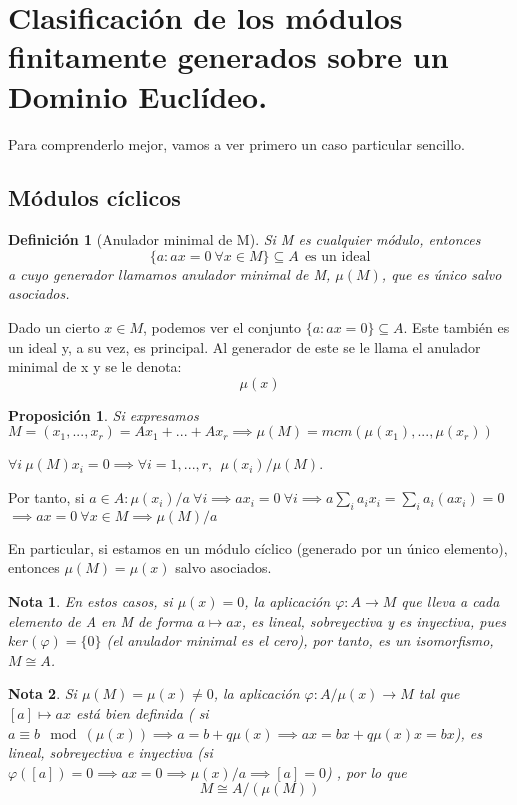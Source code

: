 \documentclass[11pt, a4paper, titlepage]{article}
\makeatletter
\renewenvironment{proof}[1][\proofname] {\vspace{-15pt}\par\pushQED{\qed}\normalfont\topsep6\p@\@plus6\p@\relax\trivlist\item[\hskip\labelsep\it#1\@addpunct{.}]\ignorespaces}{\popQED\endtrivlist\@endpefalse}
\theoremstyle{theorem-style}
\newtheorem*{nprop}{Proposición}
\theoremstyle{definition-style}
\newtheorem*{ndef}{Definición}
\theoremstyle{remark-style}
\newtheorem*{nota}{Nota}
\theoremstyle{example-style}
\makeatother
\begin{document}
\section{Clasificación de los módulos finitamente generados sobre un Dominio Euclídeo.}

Para comprenderlo mejor, vamos a ver primero un caso particular sencillo.
\subsection{Módulos cíclicos}
\begin{ndef}[Anulador minimal de M]
	Si M es cualquier módulo, entonces
	\[
	\{a: ax = 0 \ \forall x \in M\}\subseteq A \ \  \text{es un ideal}
	\]
	a cuyo generador llamamos anulador minimal de M, $\mu(M)$, que es único salvo asociados.
\end{ndef}

Dado un cierto $x\in M$, podemos ver el conjunto $\{a : ax = 0\} \subseteq A$. Este también es un ideal y, a su vez, es principal. Al generador de este se le llama el anulador minimal de x y se le denota:
\[
\mu(x)
\]

\begin{nprop}
	Si expresamos $M= (x_1,...,x_r) = Ax_1 + ...+ Ax_r \implies \mu(M) = mcm(\mu(x_1),...,\mu(x_r))$
\end{nprop}
\begin{proof}
	$\forall i \ \mu(M)x_i = 0 \implies \forall i=1,...,r, \ \ \mu(x_i) / \mu(M)$.
	
	Por tanto, si $a\in A: \mu(x_i)/a \ \forall i \implies ax_i = 0 \ \forall i \implies a\sum_i a_ix_i = \sum_i a_i(ax_i) = 0$
	$\implies ax = 0 \ \forall x \in M \implies \mu(M) / a$
\end{proof}

En particular, si estamos en un módulo cíclico (generado por un único elemento), entonces $\mu(M) = \mu(x)$ salvo asociados.

\begin{nota}
	En estos casos, si $\mu(x) = 0$, la aplicación $\varphi: A \to M$ que lleva a cada elemento de A en M de forma $a \mapsto ax$, es lineal, sobreyectiva y es inyectiva, pues $ker(\varphi) = \{0\}$ (el anulador minimal es el cero), por tanto, es un isomorfismo, $M \cong A$.
\end{nota}

\begin{nota}
	Si $\mu(M) = \mu(x) \ne 0$, la aplicación $\varphi :A/\mu(x) \to M$ tal que $[a]\mapsto ax$ está bien definida ( si $a \equiv b \mod(\mu(x)) \implies a = b+q\mu(x) \implies ax = bx +q\mu(x)x = bx$), es lineal, sobreyectiva e inyectiva (si $\varphi([a]) = 0 \implies ax = 0 \implies  \mu(x)/a \implies [a] = 0$) , por lo que
	\[
	M  \cong A/(\mu(M))
	\]
\end{nota}
\end{document}
